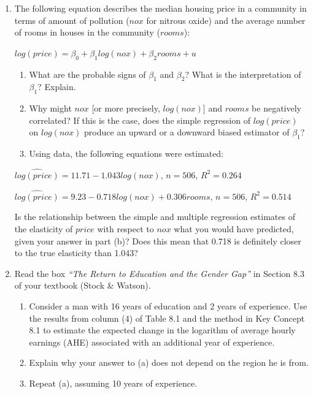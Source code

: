 \documentclass[11pt]{article}
\begin{document}
\begin{enumerate}
\def\labelenumi{\arabic{enumi}.}

\item
  The following equation describes the median housing price in a
  community in terms of amount of pollution (\(nox\) for nitrous oxide)
  and the average number of rooms in houses in the community
  (\(rooms\)):


\(log(price) = \beta_0 + \beta_1log(nox) + \beta_2rooms + u\)

\begin{enumerate}
\def\labelenumi{\alph{enumi}.}

\item
  What are the probable signs of \(\beta_1\) and \(\beta_2\)? What is
  the interpretation of \(\beta_1\)? Explain.
\item
  Why might \(nox\) {[}or more precisely, \(log(nox)\){]} and \(rooms\)
  be negatively correlated? If this is the case, does the simple
  regression of \(log(price)\) on \(log(nox)\) produce an upward or a
  downward biased estimator of \(\beta_1\)?
\item
  Using data, the following equations were estimated:
\end{enumerate}

\(\widehat{log(price)} = 11.71 - 1.043 log(nox)\), \(n = 506\),
\(R^2 = 0.264\)

\(\widehat{log(price)} = 9.23 - 0.718 log(nox) + 0.306 rooms\),
\(n = 506\), \(R^2 = 0.514\)

Is the relationship between the simple and multiple regression estimates
of the elasticity of \(price\) with respect to \(nox\) what you would
have predicted, given your answer in part (b)? Does this mean that
0.718 is definitely closer to the true elasticity than 1.043?


\item   Read the box \emph{``The Return to Education and the Gender Gap''} in
  Section 8.3 of your textbook (Stock \& Watson).


\begin{enumerate}
\def\labelenumi{\alph{enumi}.}

\item
  Consider a man with 16 years of education and 2 years of experience.
  Use the results from column (4) of Table 8.1 and the method in Key
  Concept 8.1 to estimate the expected change in the logarithm of
  average hourly earnings (AHE) associated with an additional year of
  experience.
\item
  Explain why your answer to (a) does not depend on the region he is
  from.
\item
  Repeat (a), assuming 10 years of experience.
\end{enumerate}



\end{enumerate}
\end{document}
